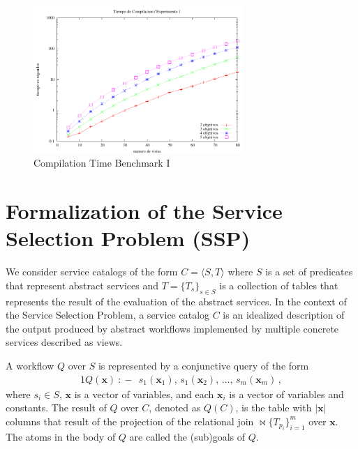 \documentclass{llncs}
\newcommand{\tup}[1]{\langle #1 \rangle}
\newcommand{\vvec}[1]{\mathbf{#1}}
\newcommand{\join}{\bowtie}
\newcommand{\qrule}{:\!\!-}
\begin{document}
\begin{figure}
\centering
\includegraphics[width=8cm]{plot1.pdf}
\caption{Compilation Time Benchmark I}
\label{fig:plot3}
\end{figure}

\section{Formalization of the Service Selection Problem (SSP)}
We consider service catalogs of the form $C=\tup{S,T}$ where
$S$ is a set of predicates that represent abstract services and $T=\{T_s\}_{s\in S}$ is a collection
of tables that represents the result of the evaluation of the abstract services. In the context of the Service Selection Problem, 
a service catalog $C$ is an idealized description of 
the output produced by abstract workflows implemented by multiple concrete services described
as views.

A workflow  $Q$ over $S$ is represented by a conjunctive query of the form 
\begin{alignat*}{1}
Q(\vvec{x})\ \qrule\ \  s_1(\vvec{x}_1),\, s_1(\vvec{x}_2),\, \ldots,\, s_m(\vvec{x}_m)\,,
\end{alignat*}
where $s_i\in S$, $\vvec{x}$ is a vector of variables, and each
$\vvec{x}_i$ is a vector of variables and constants.
The result of $Q$ over $C$, denoted as $Q(C)$, is the table with
$|\vvec{x}|$ columns that result of the projection of the relational
join $\join\!\!\{T_{p_i}\}_{i=1}^m$ over $\vvec{x}$.
The atoms in the body of $Q$ are called the (sub)goals of $Q$.
\end{document}
